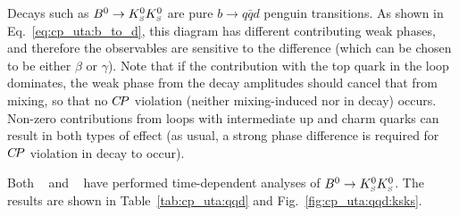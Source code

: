 Decays such as $B^0\to K^0_{\scriptscriptstyle S}K^0_{\scriptscriptstyle S}$ are pure $b \to q\bar{q}d$ penguin transitions.
As shown in Eq.~\ref{eq:cp_uta:b_to_d},
this diagram has different contributing weak phases,
and therefore the observables are sensitive to the difference 
(which can be chosen to be either $\beta$ or $\gamma$).
Note that if the contribution with the top quark in the loop dominates,
the weak phase from the decay amplitudes should cancel that from mixing,
so that no $C\!P$ violation (neither mixing-induced nor in decay) occurs.
Non-zero contributions from loops with intermediate up and charm quarks
can result in both types of effect 
(as usual, a strong phase difference is required for $C\!P$ violation in decay
to occur).

Both \babar~\cite{Aubert:2006gm} and \belle~\cite{Nakahama:2007dg}
have performed time-dependent analyses of $B^0\to K^0_{\scriptscriptstyle S}K^0_{\scriptscriptstyle S}$.
The results are shown in Table~\ref{tab:cp_uta:qqd}
and Fig.~\ref{fig:cp_uta:qqd:ksks}.



